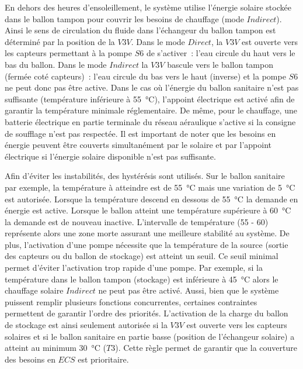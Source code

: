 En dehors des heures d’ensoleillement, le système utilise l’énergie solaire stockée dans
le ballon tampon pour couvrir les besoins de chauffage (mode $Indirect$). Ainsi le sens de
circulation du fluide dans l’échangeur du ballon tampon est déterminé par la position de
la $V3V$. Dans le mode $Direct$, la $V3V$ est ouverte vers les capteurs permettant à la
pompe $S6$ de s’activer~: l’eau circule du haut vers le bas du ballon. Dans le mode
$Indirect$ la $V3V$ bascule vers le ballon tampon (fermée coté capteurs)~: l’eau circule
du bas vers le haut (inverse) et la pompe $S6$ ne peut donc pas être active.
Dans le cas où l’énergie du ballon sanitaire n’est pas suffisante (température inférieure
à \SI{55}{\celsius}), l’appoint électrique est activé afin de garantir la température
minimale réglementaire. De même, pour le chauffage, une batterie électrique en partie
terminale du réseau aéraulique s’active si la consigne de soufflage n’est pas respectée.
Il est important de noter que les besoins en énergie peuvent être couverts simultanément
par le solaire et par l’appoint électrique si l’énergie solaire disponible n’est pas
suffisante.

Afin d’éviter les instabilités, des hystérésis sont utilisés. Sur le ballon sanitaire par
exemple, la température à atteindre est de \SI{55}{\celsius} mais une variation de
\SI{5}{\celsius} est autorisée. Lorsque la température descend en dessous de
\SI{55}{\celsius} la demande en énergie est active. Lorsque le ballon atteint une
température supérieure à \SI{60}{\celsius} la demande est de nouveau inactive.
L’intervalle de température (\num{55} - \num{60}) représente alors une zone morte assurant
une meilleure stabilité au système. De plus, l’activation d’une pompe nécessite que la
température de la source (sortie des capteurs ou du ballon de stockage) est atteint un
seuil. Ce seuil minimal permet d’éviter l’activation trop rapide d’une pompe. Par exemple,
si la température dans le ballon tampon (stockage) est inférieure à \SI{45}{\celsius}
alors le chauffage solaire $Indirect$ ne peut pas être activé. Aussi, bien que le système
puissent remplir plusieurs fonctions concurrentes, certaines contraintes permettent de
garantir l’ordre des priorités. L’activation de la charge du ballon de stockage est ainsi
seulement autorisée si la $V3V$ est ouverte vers les capteurs solaires et si le ballon
sanitaire en partie basse (position de l’échangeur solaire) a atteint au minimum
\SI{30}{\celsius} ($T3$). Cette règle permet de garantir que la couverture des besoins en
$ECS$ est prioritaire.

